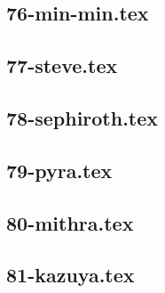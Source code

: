 \subsection{76-min-min.tex}
\subsection{77-steve.tex}
\subsection{78-sephiroth.tex}
\subsection{79-pyra.tex}
\subsection{80-mithra.tex}
\subsection{81-kazuya.tex}
